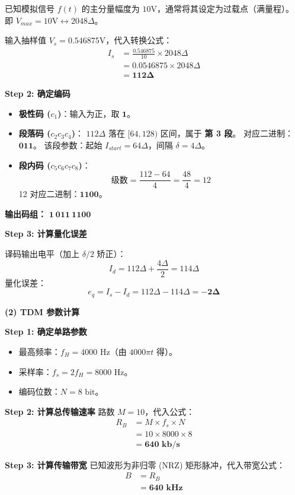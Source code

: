 \documentclass[a4paper,11pt]{ctexart}
\begin{document}
    已知模拟信号 $f(t)$ 的主分量幅度为 $10\text{V}$，通常将其设定为过载点（满量程）。
    即 $V_{max} = 10\text{V} \leftrightarrow 2048\Delta$。
    
    输入抽样值 $V_s = 0.546875\text{V}$，代入转换公式：
    \begin{align*}
        I_s &= \frac{0.546875}{10} \times 2048\Delta \\
            &= 0.0546875 \times 2048\Delta \\
            &= \mathbf{112\Delta}
    \end{align*}
    
    \textbf{Step 2: 确定编码}
    \begin{itemize}
        \item \textbf{极性码 ($c_1$)}：输入为正，取 $\mathbf{1}$。
        \item \textbf{段落码 ($c_2 c_3 c_4$)}：
            $112\Delta$ 落在 $[64, 128)$ 区间，属于 \textbf{第 3 段}。
            对应二进制：$\mathbf{011}$。
            该段参数：起始 $I_{start}=64\Delta$，间隔 $\delta=4\Delta$。
        \item \textbf{段内码 ($c_5 c_6 c_7 c_8$)}：
            $$ \text{级数} = \frac{112 - 64}{4} = \frac{48}{4} = 12 $$
            12 对应二进制：$\mathbf{1100}$。
    \end{itemize}
    \textbf{输出码组：} $\mathbf{1 \ 011 \ 1100}$
    
    \textbf{Step 3: 计算量化误差}
    
    译码输出电平（加上 $\delta/2$ 矫正）：
    $$ I_d = 112\Delta + \frac{4\Delta}{2} = 114\Delta $$
    量化误差：
    $$ e_q = I_s - I_d = 112\Delta - 114\Delta = \mathbf{-2\Delta} $$

    \vspace{0.5cm}

    \textbf{(2) TDM 参数计算}
    
    \textbf{Step 1: 确定单路参数}
    \begin{itemize}
        \item 最高频率：$f_H = 4000 \text{ Hz}$（由 $4000\pi t$ 得）。
        \item 采样率：$f_s = 2 f_H = 8000 \text{ Hz}$。
        \item 编码位数：$N = 8 \text{ bit}$。
    \end{itemize}
    
    \textbf{Step 2: 计算总传输速率}
    路数 $M=10$，代入公式：
    \begin{align*}
        R_B &= M \times f_s \times N \\
            &= 10 \times 8000 \times 8 \\
            &= \mathbf{640 \text{ kb/s}}
    \end{align*}
    
    \textbf{Step 3: 计算传输带宽}
    已知波形为非归零 (NRZ) 矩形脉冲，代入带宽公式：
    \begin{align*}
        B &= R_B \\
          &= \mathbf{640 \text{ kHz}}
    \end{align*}
\end{document}
